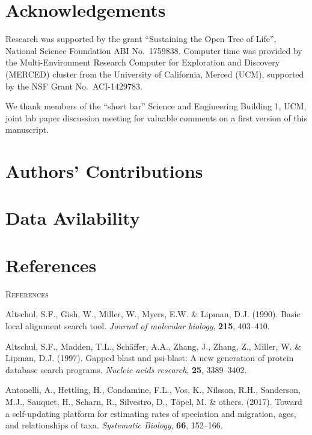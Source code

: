 \documentclass[]{article}
\begin{document}
\hypertarget{acknowledgements}{%
\section{Acknowledgements}\label{acknowledgements}}

Research was supported by the grant ``Sustaining the Open Tree of Life'', National Science Foundation ABI No.~1759838.
Computer time was provided by the Multi-Environment Research Computer for Exploration and Discovery (MERCED) cluster from the University of California, Merced (UCM), supported by the NSF Grant No.~ACI-1429783.

We thank members of the ``short bar'' Science and Engineering Building 1, UCM, joint lab paper discussion meeting for valuable comments on a first version of this manuscript.

\hypertarget{authors-contributions}{%
\section{Authors' Contributions}\label{authors-contributions}}

\hypertarget{data-avilability}{%
\section{Data Avilability}\label{data-avilability}}

\newpage

\hypertarget{references}{%
\section{References}\label{references}}

\newpage
\begin{center}
\textsc{References}
\end{center}

\hypertarget{refs}{}
\leavevmode\hypertarget{ref-altschul1990basic}{}%
Altschul, S.F., Gish, W., Miller, W., Myers, E.W. \& Lipman, D.J. (1990). Basic local alignment search tool. \emph{Journal of molecular biology}, \textbf{215}, 403--410.

\leavevmode\hypertarget{ref-altschul1997gapped}{}%
Altschul, S.F., Madden, T.L., Schäffer, A.A., Zhang, J., Zhang, Z., Miller, W. \& Lipman, D.J. (1997). Gapped blast and psi-blast: A new generation of protein database search programs. \emph{Nucleic acids research}, \textbf{25}, 3389--3402.

\leavevmode\hypertarget{ref-antonelli2017toward}{}%
Antonelli, A., Hettling, H., Condamine, F.L., Vos, K., Nilsson, R.H., Sanderson, M.J., Sauquet, H., Scharn, R., Silvestro, D., Töpel, M. \& others. (2017). Toward a self-updating platform for estimating rates of speciation and migration, ages, and relationships of taxa. \emph{Systematic Biology}, \textbf{66}, 152--166.
\end{document}
